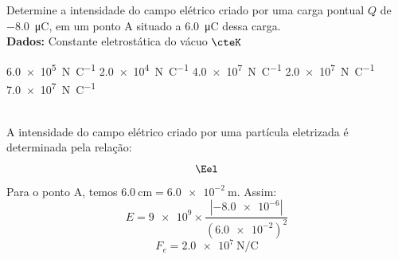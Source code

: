 

\question [\questaopt] Determine a intensidade do campo elétrico criado por
uma carga pontual $ Q $ de \SI{-8,0}{\micro\coulomb}, em um ponto A situado a \SI{6,0}{\micro\coulomb}
dessa carga. \\
\textbf{Dados:} Constante eletrostática do vácuo $ \cteK $


\begin{EnvUplevel}
	\begin{choices}
		
		\choice \SI[per-mode = symbol-or-fraction]{6,0e5}{\newton\per\coulomb}  
		\choice \SI[per-mode = symbol-or-fraction]{2,0e4}{\newton\per\coulomb}
		\choice \SI[per-mode = symbol-or-fraction]{4,0e7}{\newton\per\coulomb}
		\correctchoice \SI[per-mode = symbol-or-fraction]{2,0e7}{\newton\per\coulomb}
		\choice \SI[per-mode = symbol-or-fraction]{7,0e7}{\newton\per\coulomb}
		
	\end{choices}
\end{EnvUplevel}


\begin{EnvUplevel}
	\begin{solution}[2cm]
		{\footnotesize\\
			A intensidade do campo elétrico criado por uma partícula eletrizada
			é determinada pela relação:
			$$
			\Eel \\
			$$
			Para o ponto A, temos $\SI{6,0}{\centi \meter} = \SI{6,0e-2}{\meter}$.
			Assim:
			$$
			E=\num{9e9}\times\frac{\left| \num{-8,0e-6} \right|}{\left( \num{6,0e-2} \right)^{2}}
			$$
			$$
			F_e=\SI[per-mode = symbol-or-fraction]{2,0e7}{\newton\per\coulomb}
			$$
		}
		
	\end{solution}
\end{EnvUplevel}
